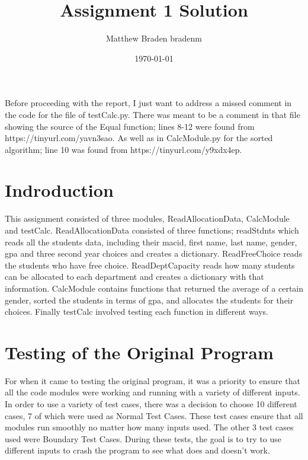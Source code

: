 \documentclass[12pt]{article}
\title{Assignment 1 Solution}
\author{Matthew Braden bradenm}
\date{\today}
\begin{document}
\maketitle

Before proceeding with the report, I just want to address a missed comment in the code for the file of 
testCalc.py. There was meant to be a comment in that file showing the source of the Equal function;
lines 8-12 were found from https://tinyurl.com/yavn3sao. As well as in CalcModule.py for the sorted algorithm; 
line 10 was found from https://tinyurl.com/y9xdx4ep.

\section{Indroduction}
This assignment consisted of three modules, ReadAllocationData, CalcModule and testCalc. ReadAllocationData consisted of three functions; readStdnts which reads all the students data, including their macid, first name, last name, gender, gpa and three second year choices and creates a dictionary. ReadFreeChoice reads the students who have free choice. ReadDeptCapacity reads how many students can be allocated to each department and creates a dictionary with that information. CalcModule contains functions that returned the average of a certain gender, sorted the students in terms of gpa, and allocates the students for their choices. Finally testCalc involved testing each function in different ways.


\section{Testing of the Original Program}
For when it came to testing the original program, it was a priority to ensure that all the code modules were working and running with a 
variety of different inputs. In order to use a variety of test cases, there was a decision to choose 10 different cases, 7 of which were used as Normal Test Cases. These test cases 
ensure that all modules run smoothly no matter how many inputs used. The other 3 test cases used were
Boundary Test Cases. During these tests, the goal is to try to use different inputs to crash the program to see what does and doesn't work.
\newline
\end{document}
